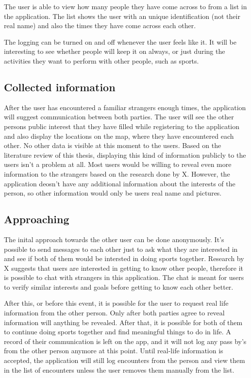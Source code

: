 The user is able to view how many people they have come across to from a list in the application. The list shows the user with an unique identification (not their real name) and also the times they have come across each other.

The logging can be turned on and off whenever the user feels like it. It will be interesting to see whether people will keep it on always, or just during the activities they want to perform with other people, such as sports.

\subsection{Collected information}

After the user has encountered a familiar strangers enough times, the application will suggest communication between both parties. The user will see the other persons public interest that they have filled while registering to the application and also display the locations on the map, where they have encountered each other. No other data is visible at this moment to the users. Based on the literature review of this thesis, displaying this kind of information publicly to the users isn't a problem at all. Most users would be willing to reveal even more information to the strangers based on the research done by X. However, the application deosn't have any additional information about the  interests of the person, so other information would only be users real name and pictures.

\subsection{Approaching}

The inital approach towards the other user can be done anonymously. It's possible to send messages to each other just to ask what they are interested in and see if both of them would be intersted in doing sports together. Research by X suggests that users are interested in getting to know other people, therefore it is possible to chat with strangers in this application. The chat is meant for users to verify similar interests and goals before getting to know each other better.

After this, or before this event, it is possible for the user to request real life information from the other person. Only after both parties agree to reveal information will anything be revealed. After that, it is possible for both of them to continue doing sports together and find meaningful things to do in life. A record of their communication is left on the app, and it will not log any pass by's from the other person anymore at this point. Until real-life information is accepted, the application will still log encounters from the person and view them in the list of encounters unless the user removes them manually from the list.

